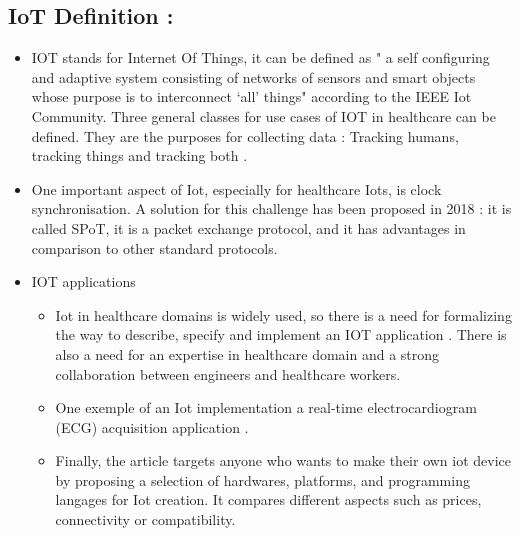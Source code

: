 \subsection{IoT Definition : }
  \begin{itemize}
  
      \item IOT stands for Internet Of Things, it can be defined as " a self configuring and adaptive system consisting 
      of networks of sensors and smart objects whose purpose is to interconnect ‘all’ things" 
      according to the IEEE Iot Community\cite{buildingIot}.
      Three general classes for use cases of IOT in healthcare can be defined. They are the purposes for  
      collecting data : Tracking humans, tracking things and tracking both \cite{buildingIot}.

      \item One important aspect of Iot, especially for healthcare Iots, is clock synchronisation. 
      A solution for this challenge has been proposed in 2018 \cite{clockIot}:
      it is called SPoT, it is a packet exchange protocol, and it has advantages in comparison to other standard protocols.

      \item IOT applications\newline
      \begin{itemize}
        \item Iot in healthcare domains is widely used, so there is a need for
        formalizing the way to describe, specify and implement an IOT application \cite{buildingIot}. 
        There is also a need for an expertise in healthcare domain and         
        a strong collaboration between engineers and healthcare workers.
        \item One exemple of an Iot implementation a real-time
        electrocardiogram (ECG) acquisition application \cite{ecgIot}.
        \item Finally, the article \cite{yourOwnIot} targets anyone 
        who wants to make their own iot device by proposing a selection of           
        hardwares, platforms, and programming langages for Iot creation. 
        It compares different aspects such as prices, connectivity or compatibility.
      \end{itemize}
  \end{itemize}

